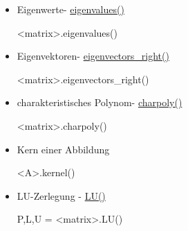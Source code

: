 \documentclass[a4paper,9pt,DIV15,twocolumn]{scrartcl}
\begin{document}
\begin{itemize}
\item Eigenwerte- \href{https://sage.math.uni-goettingen.de/doc/static/reference/sage/matrix/matrix2.html?highlight=eigenvalues#sage.matrix.matrix2.Matrix.eigenvalues}{eigenvalues()}
\begin{sagein}
<matrix>.eigenvalues()
\end{sagein}
 \item Eigenvektoren- \href{https://sage.math.uni-goettingen.de/doc/static/reference/sage/matrix/matrix2.html?highlight=eigenvalues#sage.matrix.matrix2.Matrix.eigenvectors_right}{eigenvectors\_right()}
\begin{sagein}
<matrix>.eigenvectors_right()
\end{sagein}
\item charakteristisches Polynom- \href{https://sage.math.uni-goettingen.de/doc/static/reference/sage/matrix/matrix2.html?highlight=charpoly#sage.matrix.matrix2.Matrix.charpoly}{charpoly()}
\begin{sagein}
<matrix>.charpoly() 
\end{sagein}
\item Kern einer Abbildung
	\begin{sagein}
<A>.kernel()
	\end{sagein}

\item LU-Zerlegung - \href{https://sage.math.uni-goettingen.de/doc/static/reference/sage/matrix/matrix2.html?highlight=matrix.lu#sage.matrix.matrix2.Matrix.LU}{LU()}
    \begin{sagein}
P,L,U = <matrix>.LU()
    \end{sagein}
\end{itemize}
\end{document}
